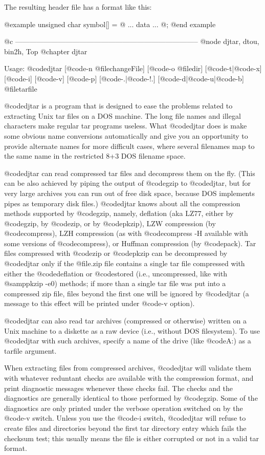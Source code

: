 The resulting header file has a format like this:

@example
unsigned char symbol[] = @{
  ... data ...
@};
@end example

@c -----------------------------------------------------------------------------
@node djtar, dtou, bin2h, Top
@chapter djtar

Usage: @code{djtar} [@code{-n} @file{changeFile}] [@code{-o} @file{dir}]
[@code{-t}|@code{-x}] [@code{-i}] [@code{-v}] [@code{-p}]
[@code{-.}|@code{-!.}] [@code{-d}|@code{-u}|@code{-b}] @file{tarfile}

@code{djtar} is a program that is designed to ease the problems related
to extracting Unix tar files on a DOS machine.  The long file names and
illegal characters make regular tar programs useless.  What @code{djtar}
does is make some obvious name conversions automatically and give you an
opportunity to provide alternate names for more difficult cases, where
several filenames map to the same name in the restricted 8+3 DOS filename
space.

@code{djtar} can read compressed tar files and decompress them on the
fly.  (This can be also achieved by piping the output of @code{gzip} to
@code{djtar}, but for very large archives you can run out of free disk
space, because DOS implements pipes as temporary disk files.)
@code{djtar} knows about all the compression methods supported by
@code{gzip}, namely, deflation (aka LZ77, either by @code{gzip}, by
@code{zip}, or by @code{pkzip}), LZW compression (by @code{compress}), LZH
compression (as with @code{compress -H} available with some versions of
@code{compress}), or Huffman compression (by @code{pack}).  Tar files
compressed with @code{zip} or @code{pkzip} can be decompressed by
@code{djtar} only if the @file{.zip} file contains a single tar file
compressed with either the @code{deflation} or @code{stored} (i.e.,
uncompressed, like with @samp{pkzip -e0}) methods; if more than a single
tar file was put into a compressed zip file, files beyond the first one
will be ignored by @code{djtar} (a message to this effect will be printed
under @code{-v} option).

@code{djtar} can also read tar archives (compressed or otherwise) written
on a Unix machine to a diskette as a raw device (i.e., without DOS
filesystem).  To use @code{djtar} with such archives, specify a name
of the drive (like @code{A:}) as a tarfile argument.

When extracting files from compressed archives, @code{djtar} will
validate them with whatever reduntant checks are available with the
compression format, and print diagnostic messages whenever these checks
fail.  The checks and the diagnostics are generally identical to those
performed by @code{gzip}.  Some of the diagnostics are only printed under
the verbose operation switched on by the @code{-v} switch.  Unless you use
the @code{-i} switch, @code{djtar} will refuse to create files and
directories beyond the first tar directory entry which fails the checksum
test; this usually means the file is either corrupted or not in a valid
tar format.

